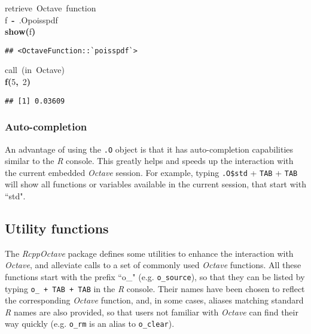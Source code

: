 \documentclass[english,10pt,a4paper]{article}\usepackage{graphicx, color}
\makeatletter
\newcommand{\hlnumber}[1]{\textcolor[rgb]{0,0,0}{#1}}%
\newcommand{\hlfunctioncall}[1]{\textcolor[rgb]{0.501960784313725,0,0.329411764705882}{\textbf{#1}}}%
\newcommand{\hlkeyword}[1]{\textcolor[rgb]{0,0,0}{\textbf{#1}}}%
\newcommand{\hlcomment}[1]{\textcolor[rgb]{0.180392156862745,0.6,0.341176470588235}{#1}}%
\newcommand{\hlassignement}[1]{\textcolor[rgb]{0,0,0}{\textbf{#1}}}%
\newcommand{\hlsymbol}[1]{\textcolor[rgb]{0,0,0}{#1}}%
\newcommand{\hlstd}[1]{\textcolor[rgb]{0,0,0}{#1}}%
\newenvironment{kframe}{%
 \def\FrameCommand##1{\hskip\@totalleftmargin \hskip-\fboxsep
 \colorbox{shadecolor}{##1}\hskip-\fboxsep
     \hskip-\linewidth \hskip-\@totalleftmargin \hskip\columnwidth}%
 \MakeFramed {\advance\hsize-\width
   \@totalleftmargin\z@ \linewidth\hsize
   \@setminipage}}%
 {\par\unskip\endMakeFramed}
\newenvironment{knitrout}{}{} %
\let\proglang=\textit
\let\code=\texttt
\newcommand{\pkgname}[1]{\textit{#1}\xspace}
\newcommand{\Rpkg}[1]{\pkgname{#1} package\xspace}
\newcommand{\octave}{\proglang{Octave}\xspace}
\makeatother
\begin{document}
\begin{knitrout}
\color{fgcolor}\begin{kframe}
\begin{flushleft}
\ttfamily\noindent
\hlcomment{\usebox{\hlnormalsizeboxhash}{\ }retrieve{\ }Octave{\ }function}\hspace*{\fill}\\
\hlstd{}\hlsymbol{f}{\ }\hlassignement{\usebox{\hlnormalsizeboxlessthan}-}{\ }\hlsymbol{.O}\hlkeyword{\usebox{\hlnormalsizeboxdollar}}\hlsymbol{poisspdf}\hspace*{\fill}\\
\hlstd{}\hlfunctioncall{show}\hlkeyword{(}\hlsymbol{f}\hlkeyword{)}\mbox{}
\normalfont
\end{flushleft}
\begin{verbatim}
## <OctaveFunction::`poisspdf`>
\end{verbatim}
\begin{flushleft}
\ttfamily\noindent
\hlcomment{\usebox{\hlnormalsizeboxhash}{\ }call{\ }(in{\ }Octave)}\hspace*{\fill}\\
\hlstd{}\hlfunctioncall{f}\hlkeyword{(}\hlnumber{5}\hlkeyword{,}{\ }\hlnumber{2}\hlkeyword{)}\mbox{}
\normalfont
\end{flushleft}
\begin{verbatim}
## [1] 0.03609
\end{verbatim}
\end{kframe}
\end{knitrout}



\subsubsection{Auto-completion}
An advantage of using the \code{.O} object is that it has auto-completion
capabilities similar to the \proglang{R} console.
This greatly helps and speeds up the interaction with the current embedded
\octave session.
For example, typing \code{.O\$std} + \code{TAB} + \code{TAB} will show all
functions or variables available in the current session, that start with ``std". 

\subsection{Utility functions}

The \Rpkg{RcppOctave} defines some utilities to enhance the interaction with
\octave, and alleviate calls to a set of commonly used
\octave functions.
All these functions start with the prefix ``o\_" (e.g.
\code{o\_source}), so that they can be listed by typing \code{o\_ + TAB + TAB}
in the \proglang{R} console.
Their names have been chosen to reflect the corresponding \octave
function, and, in some cases, aliases matching standard \proglang{R} names are
also provided, so that users not familiar with \octave can find their
way quickly (e.g. \code{o\_rm} is an alias to \code{o\_clear}).
\end{document}
